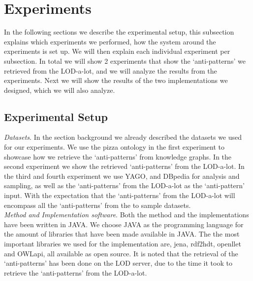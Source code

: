 \documentclass{article}
\begin{document}
\newpage
\section{Experiments}
In the following sections we describe the experimental setup, this subsection explains which experiments we performed, how the system around the experiments is set up. We will then explain each individual experiment per subsection. In total we will show 2 experiments that show the `anti-patterns' we retrieved from the LOD-a-lot, and we will analyze the results from the experiments. Next we will show the results of the two implementations we designed, which we will also analyze.

\subsection{Experimental Setup}
\textit{Datasets}. In the section background we already described the datasets we used for our experiments. We use the pizza ontology in the first experiment to showcase how we retrieve the `anti-patterns' from knowledge graphs. In the second experiment we show the retrieved `anti-patterns' from the LOD-a-lot. In the third and fourth experiment we use YAGO, and DBpedia for analysis and sampling, as well as the `anti-patterns' from the LOD-a-lot as the `anti-pattern' input. With the expectation that the `anti-patterns' from the LOD-a-lot will encompass all the `anti-patterns' from the to sample datasets.\\

\textit{Method and Implementation software}. Both the method and the implementations have been written in JAVA. We choose JAVA as the programming language for the amount of libraries that have been made available in JAVA. The the most important libraries we used for the implementation are, jena, rdf2hdt, openllet and OWLapi, all available as open source. It is noted that the retrieval of the `anti-patterns' has been done on the LOD server, due to the time it took to retrieve the `anti-patterns' from the LOD-a-lot. 
\end{document}
